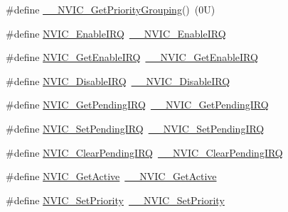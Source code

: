 \begin{DoxyCompactItemize}
\item 
\#define \hyperlink{group___c_m_s_i_s___core___n_v_i_c_functions_gab2072fe50f6d7cd208f6768919f59fae}{\+\_\+\+\_\+\+N\+V\+I\+C\+\_\+\+Get\+Priority\+Grouping}()~(0\+U)
\item 
\#define \hyperlink{group___c_m_s_i_s___core___n_v_i_c_functions_ga57b3064413dbc7459d9646020fdd8bef}{N\+V\+I\+C\+\_\+\+Enable\+I\+RQ}~\hyperlink{group___c_m_s_i_s___core___n_v_i_c_functions_ga71227e1376cde11eda03fcb62f1b33ea}{\+\_\+\+\_\+\+N\+V\+I\+C\+\_\+\+Enable\+I\+RQ}
\item 
\#define \hyperlink{group___c_m_s_i_s___core___n_v_i_c_functions_ga857de13232ec65dd15087eaa15bc4a69}{N\+V\+I\+C\+\_\+\+Get\+Enable\+I\+RQ}~\hyperlink{group___c_m_s_i_s___core___n_v_i_c_functions_gaaeb5e7cc0eaad4e2817272e7bf742083}{\+\_\+\+\_\+\+N\+V\+I\+C\+\_\+\+Get\+Enable\+I\+RQ}
\item 
\#define \hyperlink{group___c_m_s_i_s___core___n_v_i_c_functions_ga73b4e251f59cab4e9a5e234aac02ae57}{N\+V\+I\+C\+\_\+\+Disable\+I\+RQ}~\hyperlink{group___c_m_s_i_s___core___n_v_i_c_functions_gae016e4c1986312044ee768806537d52f}{\+\_\+\+\_\+\+N\+V\+I\+C\+\_\+\+Disable\+I\+RQ}
\item 
\#define \hyperlink{group___c_m_s_i_s___core___n_v_i_c_functions_gac608957a239466e9e0cbc30aa64feb3b}{N\+V\+I\+C\+\_\+\+Get\+Pending\+I\+RQ}~\hyperlink{group___c_m_s_i_s___core___n_v_i_c_functions_ga5a92ca5fa801ad7adb92be7257ab9694}{\+\_\+\+\_\+\+N\+V\+I\+C\+\_\+\+Get\+Pending\+I\+RQ}
\item 
\#define \hyperlink{group___c_m_s_i_s___core___n_v_i_c_functions_ga2b47e2e52cf5c48a5c3348636434b3ac}{N\+V\+I\+C\+\_\+\+Set\+Pending\+I\+RQ}~\hyperlink{group___c_m_s_i_s___core___n_v_i_c_functions_gaabefdd4b790b9a7308929938c0c1e1ad}{\+\_\+\+\_\+\+N\+V\+I\+C\+\_\+\+Set\+Pending\+I\+RQ}
\item 
\#define \hyperlink{group___c_m_s_i_s___core___n_v_i_c_functions_ga590cf113000a079b1f0ea3dcd5b5316c}{N\+V\+I\+C\+\_\+\+Clear\+Pending\+I\+RQ}~\hyperlink{group___c_m_s_i_s___core___n_v_i_c_functions_ga562a86dbdf14827d0fee8fdafb04d191}{\+\_\+\+\_\+\+N\+V\+I\+C\+\_\+\+Clear\+Pending\+I\+RQ}
\item 
\#define \hyperlink{group___c_m_s_i_s___core___n_v_i_c_functions_ga58ad3f352f832235ab3b192ff4745320}{N\+V\+I\+C\+\_\+\+Get\+Active}~\hyperlink{group___c_m_s_i_s___core___n_v_i_c_functions_gaa2837003c28c45abf193fe5e8d27f593}{\+\_\+\+\_\+\+N\+V\+I\+C\+\_\+\+Get\+Active}
\item 
\#define \hyperlink{group___c_m_s_i_s___core___n_v_i_c_functions_gae0e9d0e2f7b6133828c71b57d4941c35}{N\+V\+I\+C\+\_\+\+Set\+Priority}~\hyperlink{group___c_m_s_i_s___core___n_v_i_c_functions_ga505338e23563a9c074910fb14e7d45fd}{\+\_\+\+\_\+\+N\+V\+I\+C\+\_\+\+Set\+Priority}

\end{DoxyCompactItemize}
